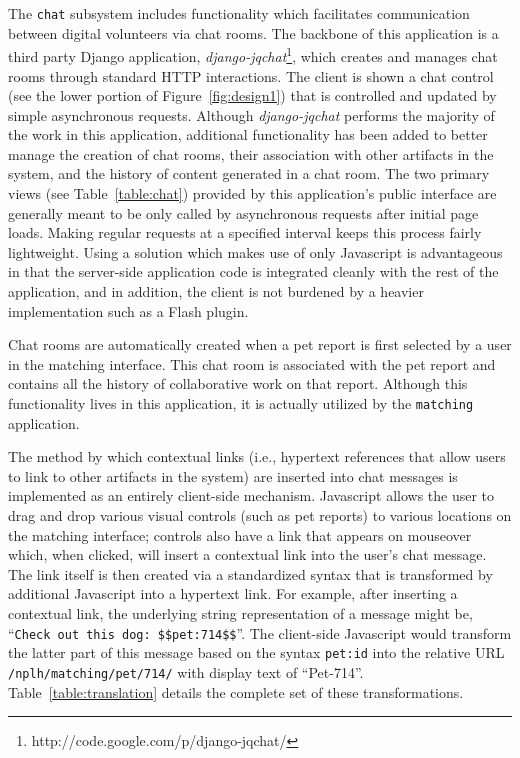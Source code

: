 The {\tt chat} subsystem includes functionality which facilitates communication between digital volunteers via chat rooms.  The backbone of this application is a third party Django application, {\em django-jqchat}\footnote{http://code.google.com/p/django-jqchat/}, which creates and manages chat rooms through standard HTTP interactions.  The client is shown a chat control (see the lower portion of Figure~\ref{fig:design1}) that is controlled and updated by simple asynchronous requests.  Although {\em django-jqchat} performs the majority of the work in this application, additional functionality has been added to better manage the creation of chat rooms, their association with other artifacts in the system, and the history of content generated in a chat room.  The two primary views (see Table~\ref{table:chat}) provided by this application's public interface are generally meant to be only called by asynchronous requests after initial page loads.  Making regular requests at a specified interval keeps this process fairly lightweight.  Using a solution which makes use of only Javascript is advantageous in that the server-side application code is integrated cleanly with the rest of the application, and in addition, the client is not burdened by a heavier implementation such as a Flash plugin. 

Chat rooms are automatically created when a pet report is first selected by a user in the matching interface.  This chat room is associated with the pet report and contains all the history of collaborative work on that report.  Although this functionality lives in this application, it is actually utilized by the {\tt matching} application.

The method by which contextual links (i.e., hypertext references that allow users to link to other artifacts in the system) are inserted into chat messages is implemented as an entirely client-side mechanism.  Javascript allows the user to drag and drop various visual controls (such as pet reports) to various locations on the matching interface; controls also have a link that appears on mouseover which, when clicked, will insert a contextual link into the user's chat message.  The link itself is then created via a standardized syntax that is transformed by additional Javascript into a hypertext link.  For example, after inserting a contextual link, the underlying string representation of a message might be, ``{\tt Check out this dog: \$\$pet:714\$\$}''.  The client-side Javascript would transform the latter part of this message based on the syntax {\tt pet:id} into the relative URL {\tt /nplh/matching/pet/714/} with display text of ``Pet-714''.  Table~\ref{table:translation} details the complete set of these transformations.

